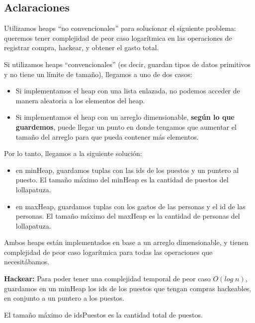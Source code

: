 \documentclass[../main.tex]{subfiles}
\begin{document}
\begin{representacion}
\subsection*{Aclaraciones} {
Utilizamos heaps ``no convencionales'' para solucionar el siguiente problema: queremos tener complejidad de peor caso logarítmica en
las operaciones de registrar compra, hackear, y obtener el gasto total.

Si utilizamos heaps ``convencionales'' (es decir, guardan tipos de datos primitivos y no tiene un límite de tamaño), llegamos a uno de dos casos:
\begin{itemize}
    \item Si implementamos el heap con una lista enlazada, no podemos acceder de manera aleatoria a los elementos del heap.
    \item Si implementamos el heap con un arreglo dimensionable, \textbf{según lo que guardemos}, puede llegar un punto en donde
    tengamos que aumentar el tamaño del arreglo para que pueda contener más elementos.
\end{itemize}

Por lo tanto, llegamos a la siguiente solución: 
\begin{itemize}
    \item en minHeap, guardamos tuplas con las ids de los puestos y un puntero al puesto. El tamaño máximo del minHeap es la cantidad de puestos del lollapatuza.
    \item en maxHeap, guardamos tuplas con los gastos de las personas y el id de las personas. El tamaño máximo del maxHeap es la
    cantidad de personas del lollapatuza.
\end{itemize}

Ambos heaps están implementados en base a un arreglo dimensionable, y tienen complejidad de peor caso logarítmica para todas las operaciones que necesitábamos.

\textbf{Hackear: }Para poder tener una complejidad temporal de peor caso $O(log \; n)$, guardamos en un minHeap los ids de los puestos que tengan compras hackeables, en conjunto a un puntero a los puestos.

El tamaño máximo de idsPuestos es la cantidad total de puestos.

}
\end{representacion}
\end{document}
